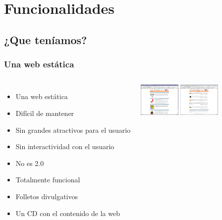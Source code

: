 \section{Funcionalidades}
	\subsection{¿Que teníamos?} %
	\begin{frame}
		\frametitle{Una web estática}
		\begin{columns}
		\column{9cm}
			\begin{itemize}
				\item <1-| alert@1> Una web estática
				\item <2-| alert@2> Difícil de mantener
				\item <3-| alert@3> Sin grandes atractivos para el usuario
				\item <4-| alert@4> Sin interactividad con el usuario
				\item <5-| alert@5> No es 2.0
				\item <6-| alert@6> Totalmente funcional
				\item <7-| alert@7> Folletos divulgativos
				\item <8-| alert@8> Un CD con el contenido de la web
			\end{itemize}

		\column{2cm}
			\includegraphics[width=2cm]{images/wl_old01.png}
			\includegraphics[width=2cm]{images/wl_old02.png}
		\end{columns}
	\end{frame}

